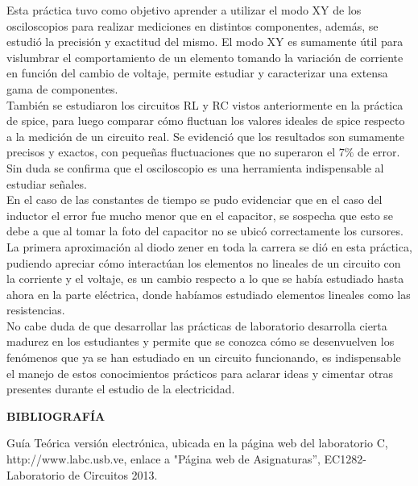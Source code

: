 \documentclass[12pt]{article}
\begin{document}
	\noindent Esta práctica tuvo como objetivo aprender a utilizar el modo XY de los osciloscopios para realizar mediciones en distintos componentes, además, se estudió la precisión y exactitud del mismo. El modo XY es sumamente útil para vislumbrar el comportamiento de un elemento tomando la variación de corriente en función del cambio de voltaje, permite estudiar y caracterizar una extensa gama de componentes.\\
	
	\noindent También se estudiaron los circuitos RL y RC vistos anteriormente en la práctica de spice, para luego comparar cómo fluctuan los valores ideales de spice respecto a la medición de un circuito real. Se evidenció que los resultados son sumamente precisos y exactos, con pequeñas fluctuaciones que no superaron el $7\%$ de error. Sin duda se confirma que el osciloscopio es una herramienta indispensable al estudiar señales.\\
	
	\noindent En el caso de las constantes de tiempo se pudo evidenciar que en el caso del inductor el error fue mucho menor que en el capacitor, se sospecha que esto se debe a que al tomar la foto del capacitor no se ubicó correctamente los cursores.\\
	
	\noindent La primera aproximación al diodo zener en toda la carrera se dió en esta práctica, pudiendo apreciar cómo interactúan los elementos no lineales de un circuito con la corriente y el voltaje, es un cambio respecto a lo que se había estudiado hasta ahora en la parte eléctrica, donde habíamos estudiado elementos lineales como las resistencias.\\
	
	\noindent No cabe duda de que desarrollar las prácticas de laboratorio desarrolla cierta madurez en los estudiantes y permite que se conozca cómo se desenvuelven los fenómenos que ya se han estudiado en un circuito funcionando, es indispensable el manejo de estos conocimientos prácticos para aclarar ideas y cimentar otras presentes durante el estudio de la electricidad.
	
	
	\newpage
	
	\begin{center}
		\textbf{\large BIBLIOGRAFÍA}\\
	\end{center}
	
	\noindent Guía Teórica versión electrónica, ubicada en la página web del laboratorio C, http://www.labc.usb.ve,
	enlace a "Página web de Asignaturas”, EC1282- Laboratorio de Circuitos 2013.
	
\end{document}
